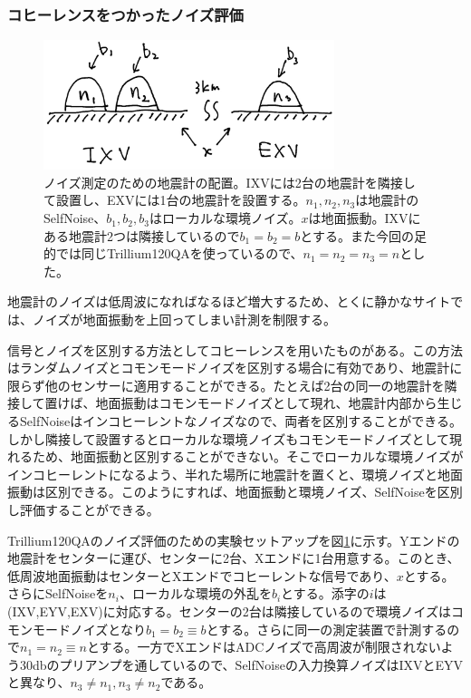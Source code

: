 \subsubsection{コヒーレンスをつかったノイズ評価}
\begin{figure}[H]
  \begin{center}
    \includegraphics[width=8.5cm]{./img_noisemeasurement.png}
  \end{center}
  \caption{ノイズ測定のための地震計の配置。IXVには2台の地震計を隣接して設置し、EXVには1台の地震計を設置する。$n_1,n_2,n_3$は地震計のSelfNoise、$b_1,b_2,b_3$はローカルな環境ノイズ。$x$は地面振動。IXVにある地震計2つは隣接しているので$b_1=b_2=b$とする。また今回の足的では同じTrillium120QAを使っているので、$n_1=n_2=n_3=n$とした。
  }\label{img:img_noisemeasurement}
\end{figure}

地震計のノイズは低周波になればなるほど増大するため、とくに静かなサイトでは、ノイズが地面振動を上回ってしまい計測を制限する。


信号とノイズを区別する方法としてコヒーレンスを用いたものがある\cite{peterson1980test}。この方法はランダムノイズとコモンモードノイズを区別する場合に有効であり、地震計に限らず他のセンサーに適用することができる\cite{barzilai1998technique}。たとえば2台の同一の地震計を隣接して置けば、地面振動はコモンモードノイズとして現れ、地震計内部から生じるSelfNoiseはインコヒーレントなノイズなので、両者を区別することができる。しかし隣接して設置するとローカルな環境ノイズもコモンモードノイズとして現れるため、地面振動と区別することができない。そこでローカルな環境ノイズがインコヒーレントになるよう、半れた場所に地震計を置くと、環境ノイズと地面振動は区別できる。このようにすれば、地面振動と環境ノイズ、SelfNoiseを区別し評価することができる。


Trillium120QAのノイズ評価のための実験セットアップを図\ref{img:img_noisemeasurement}に示す。Yエンドの地震計をセンターに運び、センターに2台、Xエンドに1台用意する。このとき、低周波地面振動はセンターとXエンドでコヒーレントな信号であり、$x$とする。さらにSelfNoiseを$n_i$、ローカルな環境の外乱を$b_i$とする。添字の$i$は(IXV,EYV,EXV)に対応する。センターの2台は隣接しているので環境ノイズはコモンモードノイズとなり$b_1=b_2\equiv b$とする。さらに同一の測定装置で計測するので$n_1=n_2\equiv n$とする。一方でXエンドはADCノイズで高周波が制限されないよう30dbのプリアンプを通しているので、SelfNoiseの入力換算ノイズはIXVとEYVと異なり、$n_3\neq n_1,n_3\neq n_2$である。


